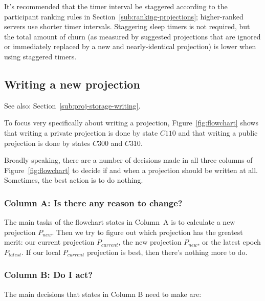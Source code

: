 \documentclass[preprint,10pt]{sigplanconf}
\begin{document}
It's recommended that the timer interval be staggered according to the
participant ranking rules in Section~\ref{sub:ranking-projections};
higher-ranked servers use shorter timer intervals.  Staggering sleep timers
is not required, but the total amount of churn (as measured by
suggested projections that are ignored or immediately replaced by a
new and nearly-identical projection) is lower when using staggered
timers.

\subsection{Writing a new projection}
\label{sub:humming-proj-storage-writing}

See also: Section~\ref{sub:proj-storage-writing}.

To focus very specifically about writing a projection,
Figure~\ref{fig:flowchart} shows that writing a private projection is
done by state $C110$ and that writing a public projection is done by
states $C300$ and $C310$.

Broadly speaking, there are a number of decisions made in all three
columns of Figure~\ref{fig:flowchart} to decide if and when a
projection should be written at all.  Sometimes, the best action is
to do nothing.

\subsubsection{Column A: Is there any reason to change?}

The main tasks of the flowchart states in Column~A is to calculate a
new projection $P_{new}$.  Then we try to figure out which
projection has the greatest merit: our current projection
$P_{current}$, the new projection $P_{new}$, or the latest epoch
$P_{latest}$.  If our local $P_{current}$ projection is best, then
there's nothing more to do.

\subsubsection{Column B: Do I act?}

The main decisions that states in Column B need to make are:
\end{document}
